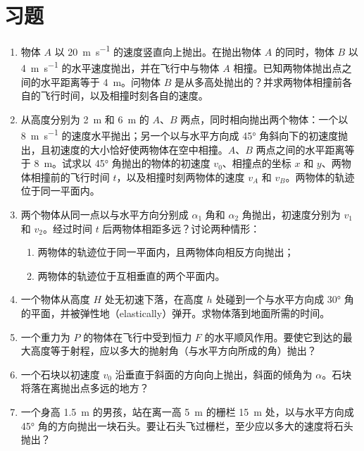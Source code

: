 \section*{习题}
\label{prob-01}

\begin{enumerate}[series=problems,first={\small}]
\item 物体 $A$ 以 \SI{20}{\meter \per \second} 的速度竖直向上抛出。在抛出物体 $A$ 的同时，物体 $B$ 以 \SI{4}{\meter \per \second} 的水平速度抛出，并在飞行中与物体 $A$ 相撞。已知两物体抛出点之间的水平距离等于 \SI{4}{m}。问物体 $B$ 是从多高处抛出的？并求两物体相撞前各自的飞行时间，以及相撞时刻各自的速度。
\item 从高度分别为 \SI{2}{\metre} 和 \SI{6}{\metre} 的 $A$、$B$ 两点，同时相向抛出两个物体：一个以 \SI{8}{\meter \per \second} 的速度水平抛出；另一个以与水平方向成 \ang{45} 角斜向下的初速度抛出，且初速度的大小恰好使两物体在空中相撞。$A$、$B$ 两点之间的水平距离等于 \SI{8}{m}。试求以 \ang{45} 角抛出的物体的初速度 $v_{0}$、相撞点的坐标 $x$ 和 $y$、两物体相撞前的飞行时间 $t$，以及相撞时刻两物体的速度 $v_{A}$ 和 $v_{B}$。两物体的轨迹位于同一平面内。
\item 两个物体从同一点以与水平方向分别成 $\alpha_{1}$ 角和 $\alpha_{2}$ 角抛出，初速度分别为 $v_{1}$ 和 $v_{2}$。经过时间 $t$ 后两物体相距多远？讨论两种情形：
\begin{enumerate}[label=(\arabic*),leftmargin=1cm]
\item 两物体的轨迹位于同一平面内，且两物体向相反方向抛出；
\item 两物体的轨迹位于互相垂直的两个平面内。
\end{enumerate}
\item 一个物体从高度 $H$ 处无初速下落，在高度 $h$ 处碰到一个与水平方向成 \ang{30} 角的平面，并被弹性地（elastically）弹开。求物体落到地面所需的时间。
\item 一个重力为 $P$ 的物体在飞行中受到恒力 $F$ 的水平顺风作用。要使它到达的最大高度等于射程，应以多大的抛射角（与水平方向所成的角）抛出？
\item 一个石块以初速度 $v_{0}$ 沿垂直于斜面的方向向上抛出，斜面的倾角为 $\alpha$。石块将落在离抛出点多远的地方？

\item 一个身高 \SI{1.5}{m} 的男孩，站在离一高 \SI{5}{m} 的栅栏 \SI{15}{m} 处，以与水平方向成 \ang{45} 角的方向抛出一块石头。要让石头飞过栅栏，至少应以多大的速度将石头抛出？
\end{enumerate}

